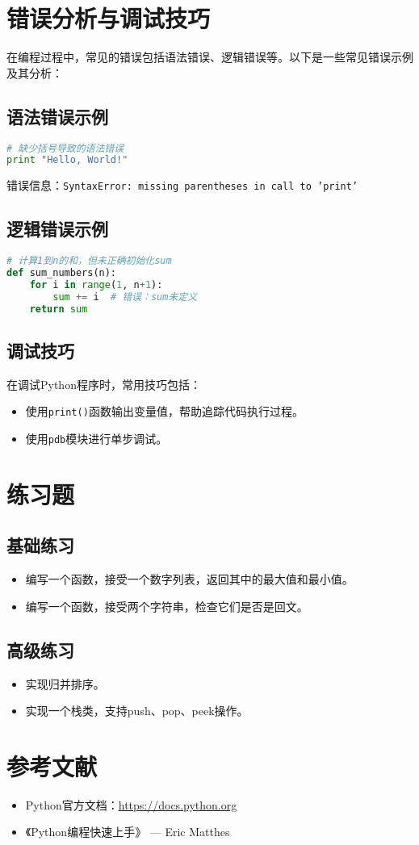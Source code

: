 \documentclass{article}
\begin{document}
\section{错误分析与调试技巧}
在编程过程中，常见的错误包括语法错误、逻辑错误等。以下是一些常见错误示例及其分析：

\subsection{语法错误示例}
\begin{lstlisting}[language=Python,caption=语法错误示例]
# 缺少括号导致的语法错误
print "Hello, World!"
\end{lstlisting}
错误信息：\texttt{SyntaxError: missing parentheses in call to 'print'}

\subsection{逻辑错误示例}
\begin{lstlisting}[language=Python,caption=逻辑错误示例]
# 计算1到n的和，但未正确初始化sum
def sum_numbers(n):
    for i in range(1, n+1):
        sum += i  # 错误：sum未定义
    return sum
\end{lstlisting}

\subsection{调试技巧}
在调试Python程序时，常用技巧包括：
\begin{itemize}
    \item 使用\texttt{print()}函数输出变量值，帮助追踪代码执行过程。
    \item 使用\texttt{pdb}模块进行单步调试。
\end{itemize}

\section{练习题}
\subsection{基础练习}
\begin{itemize}
    \item 编写一个函数，接受一个数字列表，返回其中的最大值和最小值。
    \item 编写一个函数，接受两个字符串，检查它们是否是回文。
\end{itemize}

\subsection{高级练习}
\begin{itemize}
    \item 实现归并排序。
    \item 实现一个栈类，支持push、pop、peek操作。
\end{itemize}

\section{参考文献}
\begin{itemize}
    \item Python官方文档：\href{https://docs.python.org}{https://docs.python.org}
    \item 《Python编程快速上手》 — Eric Matthes
\end{itemize}
\end{document}
